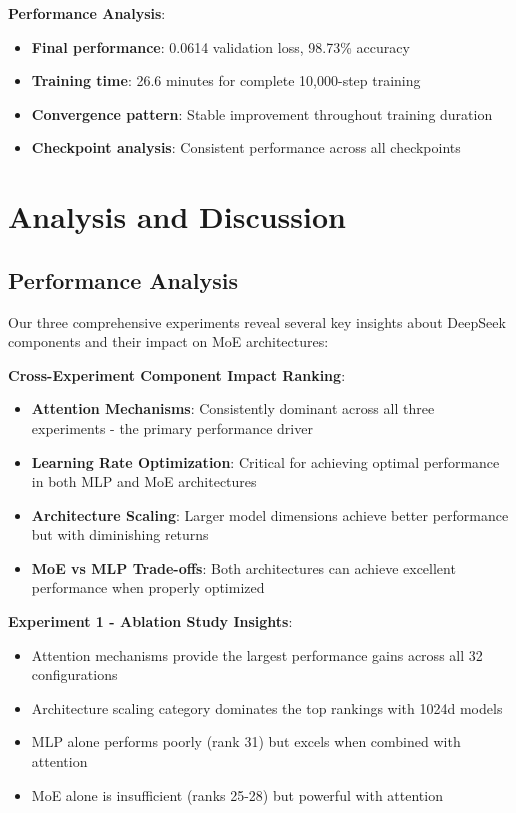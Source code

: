 \documentclass[11pt,a4paper]{article}
\begin{document}
\textbf{Performance Analysis}:
\begin{itemize}
    \item \textbf{Final performance}: 0.0614 validation loss, 98.73\% accuracy
    \item \textbf{Training time}: 26.6 minutes for complete 10,000-step training
    \item \textbf{Convergence pattern}: Stable improvement throughout training duration
    \item \textbf{Checkpoint analysis}: Consistent performance across all checkpoints
\end{itemize}


\section{Analysis and Discussion}

\subsection{Performance Analysis}

Our three comprehensive experiments reveal several key insights about DeepSeek components and their impact on MoE architectures:

\textbf{Cross-Experiment Component Impact Ranking}:
\begin{itemize}
    \item \textbf{Attention Mechanisms}: Consistently dominant across all three experiments - the primary performance driver
    \item \textbf{Learning Rate Optimization}: Critical for achieving optimal performance in both MLP and MoE architectures
    \item \textbf{Architecture Scaling}: Larger model dimensions achieve better performance but with diminishing returns
    \item \textbf{MoE vs MLP Trade-offs}: Both architectures can achieve excellent performance when properly optimized
\end{itemize}

\textbf{Experiment 1 - Ablation Study Insights}:
\begin{itemize}
    \item Attention mechanisms provide the largest performance gains across all 32 configurations
    \item Architecture scaling category dominates the top rankings with 1024d models
    \item MLP alone performs poorly (rank 31) but excels when combined with attention
    \item MoE alone is insufficient (ranks 25-28) but powerful with attention
\end{itemize}
\end{document}
